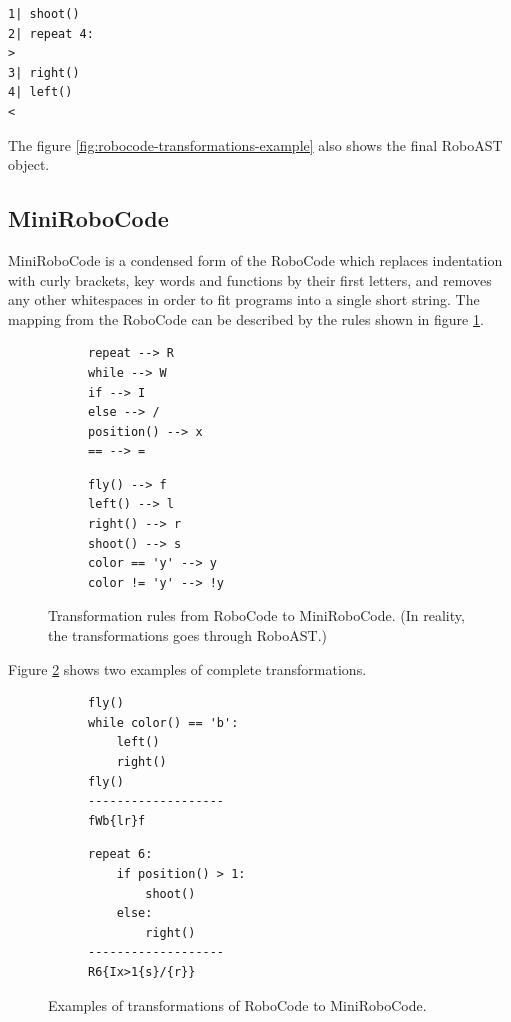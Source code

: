 \begin{lstlisting}
1| shoot()
2| repeat 4:
>
3| right()
4| left()
<
\end{lstlisting}

The figure \ref{fig:robocode-transformations-example} also shows the final RoboAST object.

\subsection{MiniRoboCode}

MiniRoboCode is a condensed form of the RoboCode
which replaces indentation with curly brackets,
key words and functions by their first letters,
and removes any other whitespaces
in order to fit programs into a single short string.
The mapping from the RoboCode can be described by the rules
shown in figure \ref{fig:minirobocode-transformation-rules}.

\begin{figure}[h]
\begin{subfigure}{.49\textwidth}
{\lstset{numbers=none}
\begin{lstlisting}
repeat --> R
while --> W
if --> I
else --> /
position() --> x
== --> =
\end{lstlisting}}
\end{subfigure}
\begin{subfigure}{.49\textwidth}
{\lstset{numbers=none}
\begin{lstlisting}
fly() --> f
left() --> l
right() --> r
shoot() --> s
color == 'y' --> y
color != 'y' --> !y
\end{lstlisting}}
\end{subfigure}
\caption{Transformation rules from RoboCode to MiniRoboCode. (In reality, the transformations goes through RoboAST.)}
\label{fig:minirobocode-transformation-rules}
\end{figure}

Figure \ref{fig:minirobocode-transformations} shows
two examples of complete transformations.
\begin{figure}[h]
\begin{subfigure}{.49\textwidth}
{\lstset{numbers=none}
\begin{lstlisting}
fly()
while color() == 'b':
    left()
    right()
fly()
-------------------
fWb{lr}f
\end{lstlisting}}
\end{subfigure}
\begin{subfigure}{.49\textwidth}
{\lstset{numbers=none}
\begin{lstlisting}
repeat 6:
    if position() > 1:
        shoot()
    else:
        right()
-------------------
R6{Ix>1{s}/{r}}
\end{lstlisting}}
\end{subfigure}
\caption{Examples of transformations of RoboCode to MiniRoboCode.}
\label{fig:minirobocode-transformations}
\end{figure}

